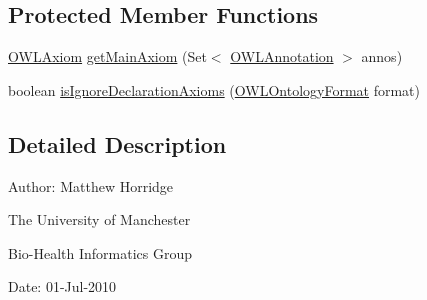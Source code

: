 \subsection*{Protected Member Functions}
\begin{DoxyCompactItemize}
\item 
\hyperlink{interfaceorg_1_1semanticweb_1_1owlapi_1_1model_1_1_o_w_l_axiom}{O\-W\-L\-Axiom} \hyperlink{classorg_1_1semanticweb_1_1owlapi_1_1api_1_1test_1_1annotations_1_1_class_declaration_with_annotations_test_case_ab0cc65f04eb1ad84a884d1f9f0ca6c74}{get\-Main\-Axiom} (Set$<$ \hyperlink{interfaceorg_1_1semanticweb_1_1owlapi_1_1model_1_1_o_w_l_annotation}{O\-W\-L\-Annotation} $>$ annos)
\item 
boolean \hyperlink{classorg_1_1semanticweb_1_1owlapi_1_1api_1_1test_1_1annotations_1_1_class_declaration_with_annotations_test_case_ab31f4a2ef7fa3b3b4ef0e9799d323cb9}{is\-Ignore\-Declaration\-Axioms} (\hyperlink{classorg_1_1semanticweb_1_1owlapi_1_1model_1_1_o_w_l_ontology_format}{O\-W\-L\-Ontology\-Format} format)
\end{DoxyCompactItemize}


\subsection{Detailed Description}
Author\-: Matthew Horridge\par
 The University of Manchester\par
 Bio-\/\-Health Informatics Group\par
 Date\-: 01-\/\-Jul-\/2010 

